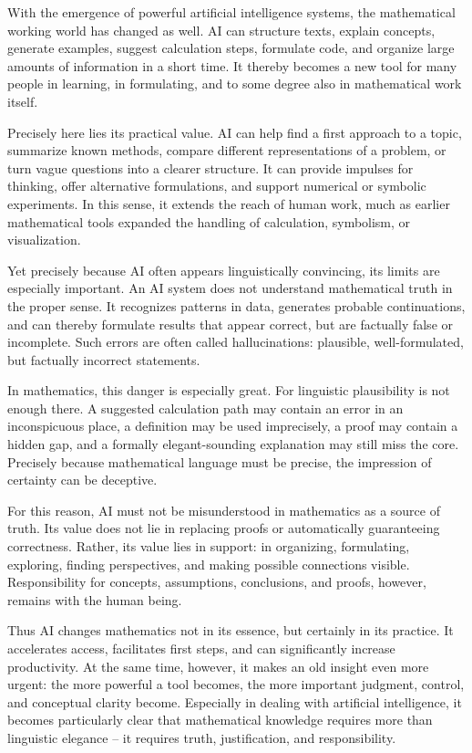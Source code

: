 With the emergence of powerful artificial intelligence systems,
the mathematical working world has changed as well.
AI can structure texts,
explain concepts,
generate examples,
suggest calculation steps,
formulate code,
and organize large amounts of information in a short time.
It thereby becomes a new tool for many people
in learning,
in formulating,
and to some degree also in mathematical work itself.

Precisely here lies its practical value.
AI can help find a first approach to a topic,
summarize known methods,
compare different representations of a problem,
or turn vague questions into a clearer structure.
It can provide impulses for thinking,
offer alternative formulations,
and support numerical or symbolic experiments.
In this sense, it extends the reach of human work,
much as earlier mathematical tools expanded the handling of calculation,
symbolism,
or visualization.

Yet precisely because AI often appears linguistically convincing,
its limits are especially important.
An AI system does not understand mathematical truth in the proper sense.
It recognizes patterns in data,
generates probable continuations,
and can thereby formulate results
that appear correct,
but are factually false or incomplete.
Such errors are often called hallucinations:
plausible, well-formulated,
but factually incorrect statements.

In mathematics, this danger is especially great.
For linguistic plausibility is not enough there.
A suggested calculation path may contain an error in an inconspicuous place,
a definition may be used imprecisely,
a proof may contain a hidden gap,
and a formally elegant-sounding explanation may still miss the core.
Precisely because mathematical language must be precise,
the impression of certainty can be deceptive.

For this reason, AI must not be misunderstood in mathematics as a source of truth.
Its value does not lie in replacing proofs
or automatically guaranteeing correctness.
Rather, its value lies in support:
in organizing,
formulating,
exploring,
finding perspectives,
and making possible connections visible.
Responsibility for concepts,
assumptions,
conclusions,
and proofs,
however, remains with the human being.

Thus AI changes mathematics not in its essence,
but certainly in its practice.
It accelerates access,
facilitates first steps,
and can significantly increase productivity.
At the same time, however,
it makes an old insight even more urgent:
the more powerful a tool becomes,
the more important judgment,
control,
and conceptual clarity become.
Especially in dealing with artificial intelligence,
it becomes particularly clear
that mathematical knowledge requires more than linguistic elegance --
it requires truth,
justification,
and responsibility.

